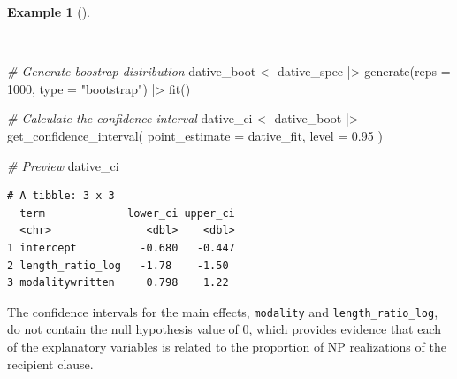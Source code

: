 \documentclass[
  letterpaper,
  krantz1]{latex/krantz-mod}
\newenvironment{Shaded}{\begin{snugshade}}{\end{snugshade}}
\newcommand{\AttributeTok}[1]{\textcolor[rgb]{0.00,0.00,0.00}{#1}}
\newcommand{\CommentTok}[1]{\textcolor[rgb]{0.00,0.00,0.00}{\textit{#1}}}
\newcommand{\DecValTok}[1]{\textcolor[rgb]{0.00,0.00,0.00}{#1}}
\newcommand{\FloatTok}[1]{\textcolor[rgb]{0.00,0.00,0.00}{#1}}
\newcommand{\FunctionTok}[1]{\textcolor[rgb]{0.00,0.00,0.00}{#1}}
\newcommand{\NormalTok}[1]{\textcolor[rgb]{0.00,0.00,0.00}{#1}}
\newcommand{\OtherTok}[1]{\textcolor[rgb]{0.00,0.00,0.00}{#1}}
\newcommand{\SpecialCharTok}[1]{\textcolor[rgb]{0.00,0.00,0.00}{#1}}
\newcommand{\StringTok}[1]{\textcolor[rgb]{0.00,0.00,0.00}{#1}}
\theoremstyle{definition}
\newtheorem{example}{Example}[chapter]
\theoremstyle{definition}
\theoremstyle{remark}
\begin{document}
\begin{example}[]\protect\hypertarget{exm-infer-cat-confidence-interval-logistic-regression}{}\label{exm-infer-cat-confidence-interval-logistic-regression}

~

\begin{Shaded}
\begin{Highlighting}[numbers=left,,]
\CommentTok{\# Generate boostrap distribution}
\NormalTok{dative\_boot }\OtherTok{\textless{}{-}}
\NormalTok{  dative\_spec }\SpecialCharTok{|\textgreater{}}
  \FunctionTok{generate}\NormalTok{(}\AttributeTok{reps =} \DecValTok{1000}\NormalTok{, }\AttributeTok{type =} \StringTok{"bootstrap"}\NormalTok{) }\SpecialCharTok{|\textgreater{}}
  \FunctionTok{fit}\NormalTok{()}

\CommentTok{\# Calculate the confidence interval}
\NormalTok{dative\_ci }\OtherTok{\textless{}{-}}
\NormalTok{  dative\_boot }\SpecialCharTok{|\textgreater{}}
  \FunctionTok{get\_confidence\_interval}\NormalTok{(}
    \AttributeTok{point\_estimate =}\NormalTok{ dative\_fit,}
    \AttributeTok{level =} \FloatTok{0.95}
\NormalTok{  )}

\CommentTok{\# Preview}
\NormalTok{dative\_ci}
\end{Highlighting}
\end{Shaded}

\begin{verbatim}
# A tibble: 3 x 3
  term             lower_ci upper_ci
  <chr>               <dbl>    <dbl>
1 intercept          -0.680   -0.447
2 length_ratio_log   -1.78    -1.50 
3 modalitywritten     0.798    1.22 
\end{verbatim}

\end{example}

The confidence intervals for the main effects, \texttt{modality} and
\texttt{length\_ratio\_log}, do not contain the null hypothesis value of
0, which provides evidence that each of the explanatory variables is
related to the proportion of NP realizations of the recipient clause.
\end{document}
